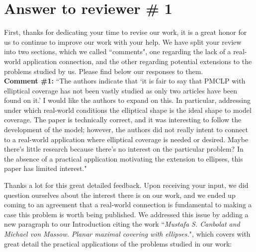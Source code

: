 
	
		
\section*{Answer to reviewer \# 1}
		
		
		First, thanks for dedicating your time to revise our work, it is a great honor for us to continue to improve our work with your help. We have split your review into two sections, which we called ``comments", one regarding the lack of a real-world application connection, and the other regarding potential extensions to the problems studied by us. Please find below our responses to them.
		\\
		
		\textbf{Comment \#1:} ``The authors indicate that `it is fair to say that PMCLP with elliptical coverage has not been vastly studied as only two articles have been found on it.' I would like the authors to expand on this. In particular, addressing under which real-world conditions the elliptical shape is the ideal shape to model coverage. The paper is technically correct, and it was interesting to follow the development of the model; however, the authors did not really intent to connect to a real-world application where elliptical coverage is needed or desired. Maybe there's little research because there's no interest on the particular problem? In the absence of a practical application motivating the extension to ellipses, this paper has limited interest."
		
		Thanks a lot for this great detailed feedback. 
		Upon receiving your input, we did question ourselves about the interest there is on our work, and we ended up coming to an agreement that a real-world connection is fundamental to making a case this problem is worth being published.
		We addressed this issue by adding a new paragraph to our Introduction citing the work ``\textit{Mustafa S. Canbolat and Michael von Massow. Planar maximal covering with ellipses.}", which covers with great detail the practical applications of the problems studied in our work:
		
